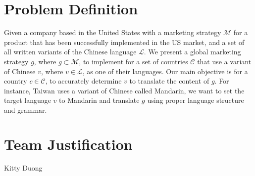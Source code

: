 \documentclass[sigconf]{acmart}
\begin{document}
\section{Problem Definition}
Given a company based in the United States with a marketing strategy $\mathcal{M}$ for a product that has been successfully implemented in the US market, and a set of all written variants of the Chinese language $\mathcal{L}$. We present a global marketing strategy $g$, where $g \subset \mathcal{M}$, to implement for a set of countries $\mathcal{C}$ that use a variant of Chinese $v$, where $v \in \mathcal{L}$, as one of their languages. Our main objective is for a country $c \in \mathcal{C}$, to accurately determine $v$ to translate the content of $g$. For instance, Taiwan uses a variant of Chinese called Mandarin, we want to set the target language $v$ to Mandarin and translate $g$ using proper language structure and grammar.

\section{Team Justification}
Kitty Duong
\end{document}
